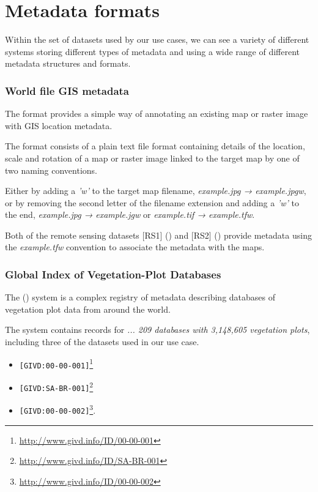 \documentclass{article}
\begin{document}
\section{Metadata formats}

Within the set of datasets used by our use cases, we can see a variety of
different systems storing different types of metadata and using a wide
range of different metadata structures and formats.

\subsubsection{World file GIS metadata}

The  format provides a simple way of
annotating an existing map or raster image with GIS location metadata.

The \cite{format-world} format consists of a plain text file format containing
details of the location, scale and rotation of a map or raster image
linked to the target map by one of two naming conventions.

Either by adding a \textit{'w'} to the target map filename, \textit{example.jpg → example.jpgw},
or by removing the second letter of the filename extension and adding a \textit{'w'} to the end,
\textit{example.jpg → example.jgw} or \textit{example.tif → example.tfw}.

Both of the remote sensing datasets
[RS1] (\cite{saatchi-2011})
and
[RS2] (\cite{baccini-2012})
provide
\cite{format-world}
metadata 
using the \textit{example.tfw} convention to associate the metadata
with the \cite{format-geotiff} maps.

\subsubsection{Global Index of Vegetation-Plot Databases}

The  (\cite{gvid}) system is a complex registry of metadata describing
databases of vegetation plot data from around the world.

The \cite{gvid} system contains records for
\textit{ ... 209 databases with 3,148,605 vegetation plots},
including three of the datasets used in our use case.

\begin{itemize}
\item \cite{forest-plots} \texttt{[GIVD:00-00-001]}\footnote{\url{http://www.givd.info/ID/00-00-001}}
\item \cite{ppbio} \texttt{[GIVD:SA-BR-001]}\footnote{\url{http://www.givd.info/ID/SA-BR-001}}
\item \cite{team}  \texttt{[GIVD:00-00-002]}\footnote{\url{http://www.givd.info/ID/00-00-002}}.
\end{itemize}
\end{document}
